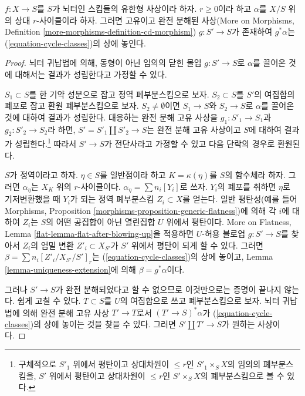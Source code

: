 \begin{lemma}
\label{lemma-get-cycles}
$f : X \to S$를 $S$가 뇌터인 스킴들의 유한형 사상이라 하자.
$r \geq 0$이라 하고 $\alpha$를 $X/S$ 위의 상대 $r$-사이클이라 하자.
그러면 고유이고 완전 분해된 사상(More on Morphisms, Definition
\ref{more-morphisms-definition-cd-morphism}) $g : S' \to S$가 존재하여
$g^*\alpha$는 (\ref{equation-cycle-classes})의 상에 놓인다.
\end{lemma}

\begin{proof}
뇌터 귀납법에 의해, 동형이 아닌 임의의 닫힌 몰입
$g : S' \to S$로 $\alpha$를 끌어온 것에 대해서는 결과가
성립한다고 가정할 수 있다.

\medskip\noindent
$S_1 \subset S$를 한 기약 성분으로 잡고 정역 폐부분스킴으로 보자.
$S_2 \subset S$를 $S'$의 여집합의 폐포로 잡고 환원 폐부분스킴으로
보자. $S_2 \not = \emptyset$이면 $S_1 \to S$와 $S_2 \to S$로
$\alpha$를 끌어온 것에 대하여 결과가 성립한다. 대응하는 완전 분해
고유 사상을 $g_1 : S'_1 \to S_1$과 $g_2 : S'_2 \to S_2$라 하면,
$S' = S'_1 \amalg S'_2 \to S$는 완전 분해 고유 사상이고 $S$에
대하여 결과가 성립한다.\footnote{구체적으로 $S'_1$ 위에서 평탄이고
상대차원이 $\leq r$인 $S'_1 \times_S X$의 임의의 폐부분스킴을,
$S'$ 위에서 평탄이고 상대차원이 $\leq r$인 $S' \times_S X$의
폐부분스킴으로 볼 수 있다.} 따라서 $S' \to S$가 전단사라고
가정할 수 있고 다음 단락의 경우로 환원된다.

\medskip\noindent
$S$가 정역이라고 하자. $\eta \in S$를 일반점이라 하고
$K = \kappa(\eta)$를 $S$의 함수체라 하자. 그러면 $\alpha_\eta$는
$X_K$ 위의 $r$-사이클이다. $\alpha_\eta = \sum n_i[Y_i]$로 쓰자.
$Y_i$의 폐포를 취하면 $\eta$로 기저변환했을 때 $Y_i$가 되는
정역 폐부분스킴 $Z_i \subset X$를 얻는다. 일반 평탄성(예를 들어
Morphisms, Proposition \ref{morphisms-proposition-generic-flatness})에
의해 각 $i$에 대하여 $Z_i$는 $S$의 어떤 공집합이 아닌 열린집합
$U$ 위에서 평탄이다. More on Flatness, Lemma
\ref{flat-lemma-flat-after-blowing-up}을 적용하면 $U$-허용 블로업
$g : S' \to S$를 찾아서 $Z_i$의 엄밀 변환
$Z'_i \subset X_{S'}$가 $S'$ 위에서 평탄이 되게 할 수 있다.
그러면 $\beta = \sum n_i[Z'_i/X_{S'}/S']_r$는
(\ref{equation-cycle-classes})의 상에 놓이고, Lemma
\ref{lemma-uniqueness-extension}에 의해 $\beta = g^*\alpha$이다.

\medskip\noindent
그러나 $S' \to S$가 완전 분해되었다고 할 수 없으므로 이것만으로는
증명이 끝나지 않는다. 쉽게 고칠 수 있다. $T \subset S$를 $U$의
여집합으로 쓰고 폐부분스킴으로 보자. 뇌터 귀납법에 의해 완전 분해
고유 사상 $T' \to T$로서 $(T' \to S)^*\alpha$가
(\ref{equation-cycle-classes})의 상에 놓이는 것을 찾을 수 있다.
그러면 $S' \amalg T' \to S$가 원하는 사상이다.
\end{proof}

